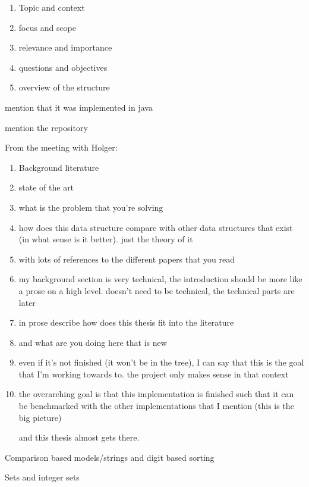 
\begin{enumerate}
    \item
    Topic and context
    \item
    focus and scope
    \item
    relevance and importance
    \item
    questions and objectives
    \item
    overview of the structure
\end{enumerate}

mention that it was implemented in java

mention the repository

From the meeting with Holger:
\begin{enumerate}
    \item
    Background literature
    
    \item
    state of the art
    
    \item
    what is the problem that you're solving
    
    \item
    how does this data structure compare with other data structures that exist (in what sense is it better). just the theory of it
    
    \item
    with lots of references to the different papers that you read
    
    \item
    my background section is very technical, the introduction should be more like a prose on a high level. doesn't need to be technical, the technical parts are later
    
    \item
    in prose describe how does this thesis fit into the literature
    
    \item
    and what are you doing here that is new
    
    \item
    even if it's not finished (it won't be in the tree), I can say that this is the goal that I'm working towards to. the project only makes sense in that context
    
    \item
    the overarching goal is that this implementation is finished such that it can be benchmarked with the other implementations that I mention (this is the big picture)
    
    and this thesis almost gets there.
\end{enumerate}


Comparison based models/strings and digit based sorting

Sets and integer sets

